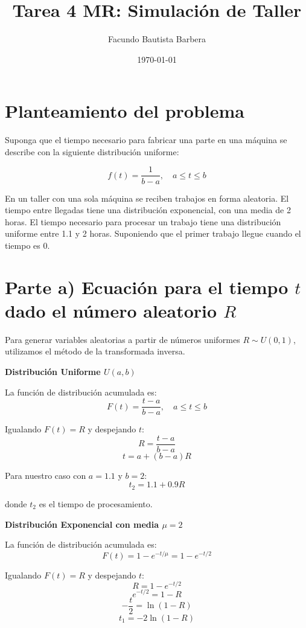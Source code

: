 \documentclass{article}
\title{Tarea 4 MR: Simulación de Taller}
\author{Facundo Bautista Barbera}
\date{\today}
\begin{document}
\maketitle

\section*{Planteamiento del problema}

Suponga que el tiempo necesario para fabricar una parte en una máquina se describe con la siguiente distribución uniforme:

$$f(t) = \frac{1}{b-a}, \quad a \leq t \leq b$$

En un taller con una sola máquina se reciben trabajos en forma aleatoria. El tiempo entre llegadas tiene una distribución exponencial, con una media de 2 horas. El tiempo necesario para procesar un trabajo tiene una distribución uniforme entre 1.1 y 2 horas. Suponiendo que el primer trabajo llegue cuando el tiempo es 0.

\section*{Parte a) Ecuación para el tiempo $t$ dado el número aleatorio $R$}

Para generar variables aleatorias a partir de números uniformes $R \sim U(0,1)$, utilizamos el método de la transformada inversa.

\textbf{Distribución Uniforme $U(a,b)$}

\vspace{0.3cm}
La función de distribución acumulada es:
$$F(t) = \frac{t-a}{b-a}, \quad a \leq t \leq b$$

Igualando $F(t) = R$ y despejando $t$:
$$R = \frac{t-a}{b-a}$$
$$t = a + (b-a)R$$

Para nuestro caso con $a = 1.1$ y $b = 2$:
$$\boxed{t_2 = 1.1 + 0.9R}$$

donde $t_2$ es el tiempo de procesamiento.

\vspace{0.5cm}
\textbf{Distribución Exponencial con media $\mu = 2$}

\vspace{0.3cm}
La función de distribución acumulada es:
$$F(t) = 1 - e^{-t/\mu} = 1 - e^{-t/2}$$

Igualando $F(t) = R$ y despejando $t$:
$$R = 1 - e^{-t/2}$$
$$e^{-t/2} = 1 - R$$
$$-\frac{t}{2} = \ln(1-R)$$
$$\boxed{t_1 = -2\ln(1-R)}$$
\end{document}
